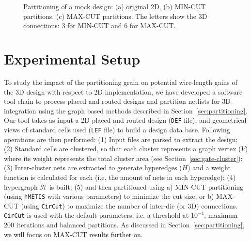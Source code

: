 \documentclass[conference]{IEEEtran}
\begin{document}
\begin{figure}
\centering
{}
\hfill
{}
\hfill
{}
\caption{Partitioning of a mock design: (a) original 2D, (b) MIN-CUT partitions, (c) MAX-CUT partitions. The letters show the 3D connections: 3 for MIN-CUT and 6 for MAX-CUT.}
\label{fig:3Dpart}
\end{figure}

\section{Experimental Setup}\label{sec:setup}
To study the impact of the partitioning grain on potential wire-length gains of the 3D design with respect to 2D implementation, we have developed a software tool chain to process placed and routed designs and partition netlists for 3D integration using the graph based methods described in Section~\ref{sec:partitioning}. Our tool takes as input a 2D placed and routed design (\texttt{DEF} file), and geometrical views of standard cells used (\texttt{LEF} file) to build a design data base. Following operations are then performed: (1) Input files are parsed to extract the design; (2) Standard cells are clustered, so that each cluster represents a graph vertex ($V$) where its weight represents the total cluster area (see Section~\ref{sec:gate-cluster}); (3) Inter-cluster nets are extracted to generate hyperedges ($H$) and a weight function is calculated for each (i.e. the amount of nets in each hyperedge); 
(4) hypergraph $\mathcal{H}$ is built; (5) and then partitioned using 
a) MIN-CUT partitioning (using \texttt{hMETIS} with various parameters) to minimize the cut size, or b) 
MAX-CUT (using \texttt{CirCut}) to maximize the number of inter-die (or 3D) connections.
\texttt{CirCut} is used with the default parameters, i.e. a threshold at $10^{-4}$, maximum 200 iterations and balanced partitions.
As discussed in Section~\ref{sec:partitioning}, we will focus on MAX-CUT results further on.
\end{document}
